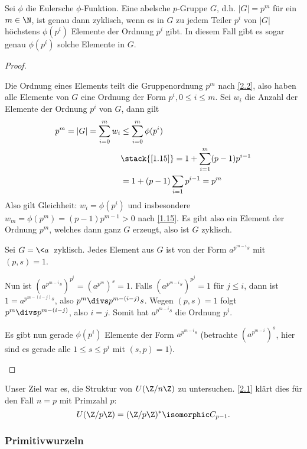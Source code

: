 \begin{lem} \label{2.6}
	Sei $\phi$ die Eulersche $\phi$-Funktion.
	Eine abelsche $p$-Gruppe $G$, d.h. $|G| = p^m$ für ein $m \in \N$, ist genau dann zyklisch, wenn es in $G$ zu jedem Teiler $p^i$ von $|G|$ höchstens $\phi(p^i)$ Elemente der Ordnung $p^i$ gibt.
	In diesem Fall gibt es sogar genau $\phi(p^i)$ solche Elemente in $G$.
	\begin{proof}
		\begin{seg}{\ProofImplication*}
			Die Ordnung eines Elements teilt die Gruppenordnung $p^m$ nach \ref{2.2}, also haben alle Elemente von $G$ eine Ordnung der Form $p^i, 0 \le i \le m$.
			Sei $w_i$ die Anzahl der Elemente der Ordnung $p^i$ von $G$, dann gilt
			\begin{align*}
				p^m
				= |G|
				= \sum_{i=0}^m w_i
				&\le \sum_{i=0}^m \phi(p^i) \\
				&\stack{\ref{1.15}}= 1 + \sum_{i=1}^m (p-1)p^{i-1} \\
				&= 1 + (p-1)\sum_{i=1} p^{i-1}
				= p^m
			\end{align*}
			Also gilt Gleichheit: $w_i = \phi(p^i)$ und insbesondere $w_m = \phi(p^m) = (p-1)p^{m-1} > 0$ nach \ref{1.15}.
			Es gibt also ein Element der Ordnung $p^m$, welches dann ganz $G$ erzeugt, also ist $G$ zyklisch.
		\end{seg}
		\begin{seg}{\ProofImplication}
			Sei $G = \<a\>$ zyklisch.
			Jedes Element aus $G$ ist von der Form $a^{p^{m-i} s}$ mit $(p, s) = 1$.

			Nun ist $(a^{p^{m-i} s})^{p^i} = (a^{p^m})^s = 1$.
			Falls $(a^{p^{m-i} s})^{p^j} = 1$ für $j \le i$, dann ist $1 = a^{p^{m-(i-j)} s}$, also $p^m \divs p^{m-(i-j)} s$.
			Wegen $(p, s) = 1$ folgt $p^m \divs p^{m-(i-j)}$, also $i = j$.
			Somit hat $a^{p^{m-i} s}$ die Ordnung $p^i$.

			Es gibt nun gerade $\phi(p^i)$ Elemente der Form $a^{p^{m-i} s}$ (betrachte $(a^{p^{m-i}})^s$, hier sind es gerade alle $1 \le s \le p^i$ mit $(s, p) = 1$).
		\end{seg}
	\end{proof}
\end{lem}


Unser Ziel war es, die Struktur von $U(\Z / n \Z)$ zu untersuchen.
\ref{2.1} klärt dies für den Fall $n = p$ mit Primzahl $p$:
\[
	U(\Z / p \Z) = (\Z / p \Z)^* \isomorphic C_{p-1}.
\]

\subsubsection{Primitivwurzeln}

